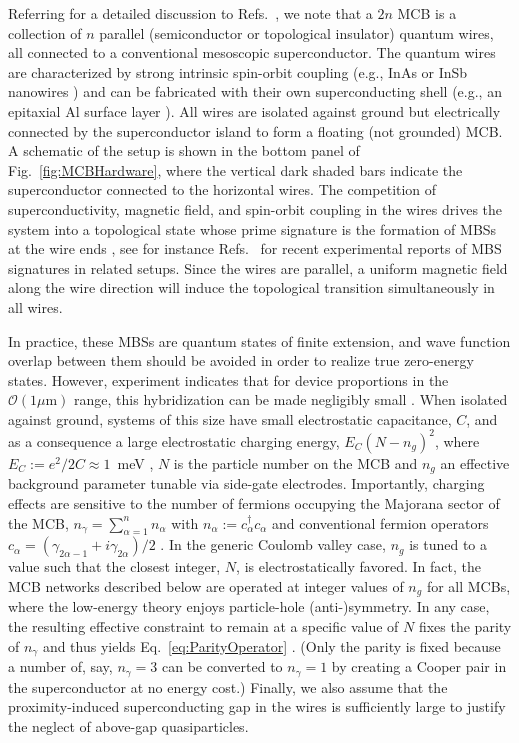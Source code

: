 \documentclass[twocolumn,floats,prx,showpacs]{revtex4-1}
\begin{document}
 Referring for a detailed discussion to Refs.~\cite{PhysRevLett.116.050501,Plugge2017,Karzig2017}, we note that a $2n$ MCB is a collection of $n$ parallel (semiconductor or topological insulator) quantum wires, all connected to a conventional mesoscopic superconductor. The quantum wires are characterized by strong intrinsic spin-orbit coupling (e.g., InAs or InSb nanowires \cite{Lutchyn2018}) and can be fabricated with their own superconducting shell (e.g., an epitaxial Al surface layer \cite{Albrecht2016}).   All wires are isolated against ground but electrically connected by the superconductor island to form a floating (not grounded) MCB. A schematic of the setup is shown in the bottom panel of Fig.~\ref{fig:MCBHardware}, where the vertical dark shaded bars indicate the superconductor connected to the horizontal wires. The competition of superconductivity, magnetic field, and spin-orbit coupling in the wires drives the system into a topological state whose prime signature is the formation of MBSs at the wire ends \cite{Alicea2012,Leijnse2012,Beenakker2013,Sarma2015,Aguado2017,Lutchyn2018}, see for instance Refs.~\cite{Mourik2012,Albrecht2016,Deng2016,Nichele2017,Gazi2017,Zhang2018} for recent experimental reports of MBS signatures in related setups.  
Since the wires are parallel, a uniform magnetic field along the wire direction will induce the topological transition simultaneously in all wires.

In practice, these MBSs are quantum states of finite extension, and wave function overlap between them should be avoided in order to realize true zero-energy states. However, experiment indicates that for device proportions in the $\mathcal{O}(1\mu\mathrm{m})$ range, this hybridization can be made negligibly small \cite{Albrecht2016,Lutchyn2018}.
When isolated against ground, systems of this size have small electrostatic capacitance, $C$, and as a consequence a large electrostatic charging energy, $E_C(N-n_g)^2$, where $E_C:= e^2/2C\approx 1$~meV \cite{Albrecht2016},  $N$ is the particle number on the MCB and $n_g$ an effective background parameter tunable via side-gate electrodes. Importantly, charging effects are sensitive to the number of fermions occupying the Majorana sector of the MCB, $n_\gamma=\sum_{\alpha=1}^n n_\alpha$ with $n_\alpha:= c^\dagger_\alpha c_\alpha$ and  conventional fermion operators $c_\alpha=(\gamma_{2\alpha-1}+ i \gamma_{2\alpha})/2$ \cite{Fu2010}. In the generic Coulomb valley case, $n_g$ is tuned to a value such that the closest integer, $N$, is electrostatically favored. In fact, the MCB networks described below are operated at integer values of $n_g$ for all MCBs, where the low-energy theory enjoys particle-hole (anti-)symmetry. In any case, the resulting effective constraint to remain at a specific value of $N$ fixes the parity of $n_\gamma$ and thus yields Eq.~\eqref{eq:ParityOperator} \cite{Beri2012,Altland2013,Hyart2013}. (Only the parity is fixed  because a number of, say, $n_\gamma=3$ can be converted to $n_\gamma=1$ by creating a Cooper pair in the superconductor at no energy cost.)  Finally, we also assume that the proximity-induced superconducting gap in the wires is  sufficiently large to justify the neglect of above-gap quasiparticles.
\end{document}

